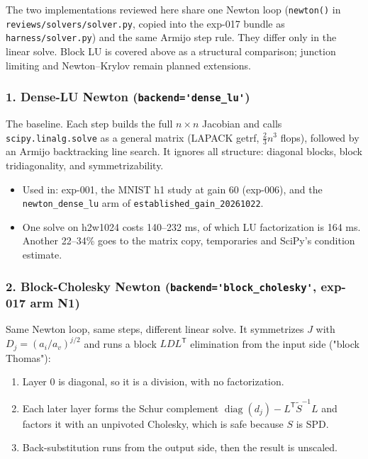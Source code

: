 \documentclass[11pt,a4paper]{article}
\begin{document}
The two implementations reviewed here share one Newton loop (\nolinkurl{newton()} in
\nolinkurl{reviews/solvers/solver.py}, copied into the exp-017 bundle as
\nolinkurl{harness/solver.py}) and the same Armijo step rule. They differ only in the
linear solve. Block LU is covered above as a structural comparison; junction limiting
and Newton--Krylov remain planned extensions.

\subsubsection*{1. Dense-LU Newton (\nolinkurl{backend='dense_lu'})}

The baseline. Each step builds the full $n\times n$ Jacobian and calls
\nolinkurl{scipy.linalg.solve} as a general matrix (LAPACK getrf, $\frac{2}{3}n^3$
flops), followed by an Armijo backtracking line search. It ignores all structure:
diagonal blocks, block tridiagonality, and symmetrizability.

\begin{itemize}
\item Used in: exp-001, the MNIST h1 study at gain 60 (exp-006), and the
\nolinkurl{newton_dense_lu} arm of \nolinkurl{established_gain_20261022}.
\item One solve on h2w1024 costs 140--232 ms, of which LU factorization is 164 ms. Another
22--34\% goes to the matrix copy, temporaries and SciPy's condition estimate.
\end{itemize}

\subsubsection*{2. Block-Cholesky Newton (\nolinkurl{backend='block_cholesky'}, exp-017 arm N1)}

Same Newton loop, same steps, different linear solve. It symmetrizes $J$ with
$D_j=(a_i/a_v)^{j/2}$ and runs a block $LDL^{\mathsf T}$ elimination from the input side
("block Thomas"):

\begin{enumerate}
\item Layer 0 is diagonal, so it is a division, with no factorization.
\item Each later layer forms the Schur complement $\operatorname{diag}(d_j)-L^{\mathsf
T}\widetilde S^{-1}L$ and factors it with an unpivoted Cholesky, which is safe because
$S$ is SPD.
\item Back-substitution runs from the output side, then the result is unscaled.
\end{enumerate}
\end{document}
